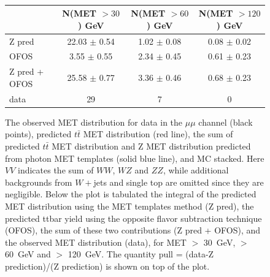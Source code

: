 \begin{figure}[hbtp]
  \begin{center}
	\\ \medskip 
    \begin{tabular}{lccc}
\hline
                        &   N(MET $>30$)  GeV    &   N(MET $>60$)  GeV    &   N(MET $>120$) GeV   \\
\hline
              Z pred    &  22.03  $\pm$  0.54    &   1.02  $\pm$  0.08    &   0.08  $\pm$  0.02   \\
                OFOS    &   3.55  $\pm$  0.55    &   2.34  $\pm$  0.45    &   0.61  $\pm$  0.23   \\
\hline
       Z pred + OFOS    &  25.58  $\pm$  0.77    &   3.36  $\pm$  0.46    &   0.68  $\pm$  0.23   \\
\hline
                data    &                  29    &                   7    &                   0   \\
\hline
    \end{tabular}
    \caption{
      The observed MET distribution for data in the $\mu\mu$ channel (black points),
      predicted $t\bar{t}$ MET distribution (red line), the sum of predicted $t\bar{t}$ MET distribution and
      Z  MET  distribution  predicted  from photon  MET  templates
      (solid blue line),  and MC stacked. Here $VV$  indicates the sum
      of  $WW$,  $WZ$  and  $ZZ$, while  additional  backgrounds  from
      $W+$jets   and   single  top   are   omitted   since  they   are
      negligible.  Below the  plot is  tabulated the  integral  of the
      predicted  MET distribution  using the  MET templates  method (Z
      pred),  the  predicted ttbar  yield  using  the opposite  flavor
      subtraction  technique (OFOS), the  sum of  these two
      contributions (Z pred + OFOS), and the observed MET distribution
      (data), for  MET $>$ 30~GeV,  $>$ 60~GeV and $>$  120~GeV. The
      quantity pull  = (data-Z prediction)/(Z prediction)  is shown on
      top  of the  plot.  
    }
    \label{fig:pfmet_mm}
  \end{center}
\end{figure}


